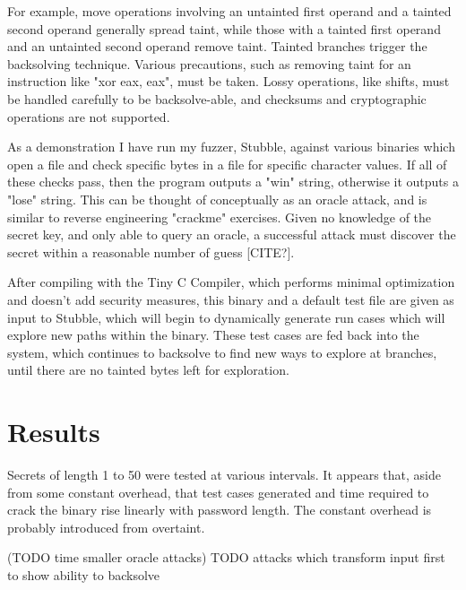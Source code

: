 \documentclass[11pt,expanded,copyright]{fsuthesis}
\begin{document}
For example, move operations involving an untainted first operand and a tainted second operand generally spread taint, while those with a tainted first operand and an untainted second operand remove taint. Tainted branches trigger the backsolving technique. Various precautions, such as removing taint for an instruction like "xor eax, eax", must be taken. Lossy operations, like shifts, must be handled carefully to be backsolve-able, and checksums and cryptographic operations are not supported.
	
As a demonstration I have run my fuzzer, Stubble, against various binaries which open a file and check specific bytes in a file for specific character values. If all of these checks pass, then the program outputs a "win" string, otherwise it outputs a "lose" string. This can be thought of conceptually as an oracle attack, and is similar to reverse engineering "crackme" exercises. Given no knowledge of the secret key, and only able to query an oracle, a successful attack must discover the secret within a reasonable number of guess [CITE?].

After compiling with the Tiny C Compiler, which performs minimal optimization and doesn't add security measures, this binary and a default test file are given as input to Stubble, which will begin to dynamically generate run cases which will explore new paths within the binary. These test cases are fed back into the system, which continues to backsolve to find new ways to explore at branches, until there are no tainted bytes left for exploration.


	
\section{Results}

Secrets of length 1 to 50 were tested at various intervals. It appears that, aside from some constant overhead, that test cases generated and time required to crack the binary  rise linearly with password length. The constant overhead is probably introduced from overtaint.


(TODO time smaller oracle attacks)
TODO attacks which transform input first to show ability to backsolve

\end{document}
